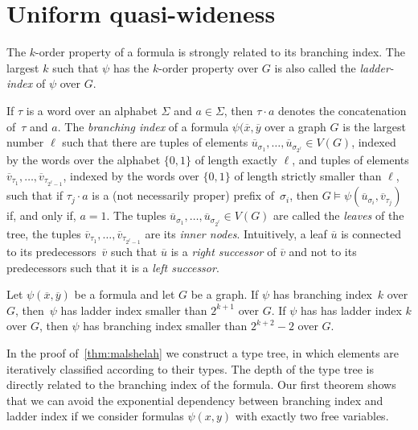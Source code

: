\documentclass[11pt, fleqn]{article}
\theoremstyle{plain}
\theoremstyle{nonumberplain}
\newcommand{\tup}[1]{\overline{#1}}
\begin{document}
\section{Uniform quasi-wideness}\label{sec:uqw}

The $k$-order property of a formula is strongly related
to its branching index. The largest $k$ such that 
$\psi$ has the $k$-order property over $G$ is
also called the \emph{ladder-index} of $\psi$ over $G$. 

If $\tau$ is a word over an alphabet $\Sigma$ and
$a\in \Sigma$, then $\tau\cdot a$ denotes the concatenation of~$\tau$
and $a$.  The \emph{branching index} of a formula $\psi(\tup{x},\tup{y}$
over a graph $G$ is the largest number
$\ell$ such that there are tuples of elements
$\tup{u}_{\sigma_1},\ldots, \tup{u}_{\sigma_{2^\ell}}\in V(G)$, indexed by the
words over the alphabet $\{0,1\}$ of length exactly $\ell$, and
tuples of elements $\tup{v}_{\tau_1},\ldots, \tup{v}_{\tau_{2^\ell-1}}$, indexed by the
words over $\{0,1\}$ of length strictly smaller than $\ell$, such that
if $\tau_j\cdot a$ is a (not necessarily proper) prefix of~$\sigma_i$, then
$G\models \psi(\tup{u}_{\sigma_i},\tup{v}_{\tau_j})$ if, and only if, $a=1$. The tuples
$\tup{u}_{\sigma_1},\ldots, \tup{u}_{\sigma_{2^\ell}}\in V(G)$ are called the 
\emph{leaves} of the tree, the tuples $\tup{v}_{\tau_1},\ldots, \tup{v}_{\tau_{2^\ell-1}}$
are its \emph{inner nodes}. Intuitively, a leaf $\tup{u}$ is connected to its 
predecessors~$\tup{v}$ such
that $\tup{u}$ is a \emph{right successor} of $\tup{v}$ and not to its predecessors such that 
it is a \emph{left
successor}. 
     

\begin{lemma}\label{lem:branching}
  Let $\psi(\tup{x},\tup{y})$ be a formula and let $G$ be a graph. 
  If $\psi$ has branching index~$k$ over $G$, 
  then~$\psi$ has ladder index smaller than $2^{k+1}$ over $G$. 
  If $\psi$ has  has
  ladder index $k$ over $G$, then $\psi$ has branching index smaller than
  $2^{k+2}-2$ over $G$.
 \end{lemma}

In the proof of~\cref{thm:malshelah} we construct a type tree, in which
elements are iteratively classified according to their types. The depth of 
the type tree is directly related to the branching index of the formula. 
Our first theorem shows that we can avoid the exponential dependency 
between branching index and ladder index if we consider formulas $\psi(x,y)$
with exactly two free variables. 
\end{document}
